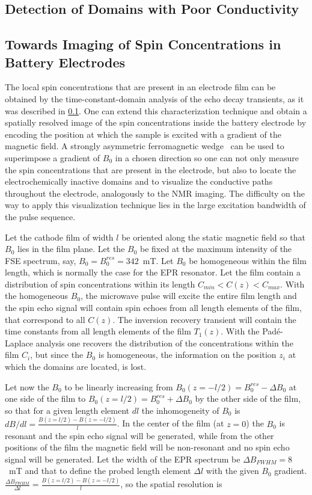 \subsection{Detection of Domains with Poor Conductivity}
\label{sec:domains_distinction_by_relaxation}

\subsection{Towards Imaging of Spin Concentrations in Battery Electrodes}
The local spin concentrations that are present in an electrode film can be obtained by the time-constant-domain analysis of the echo decay transients, as it was described in \ref{sec:domains_distinction_by_relaxation}. One can extend this characterization technique and obtain a spatially resolved image of the spin concentrations inside the battery electrode by encoding the position at which the sample is excited with a gradient of the magnetic field. A strongly asymmetric ferromagnetic wedge~\cite{SternGerlach1922} can be used to superimpose a gradient of $B_0$ in a chosen direction so one can not only measure the spin concentrations that are present in the electrode, but also to locate the electrochemically inactive domains and to visualize the conductive paths throughout the electrode, analogously to the NMR imaging. The difficulty on the way to apply this visualization technique lies in the large excitation bandwidth of the pulse sequence.
\par
Let the cathode film of width $l$ be oriented along the static magnetic field so that $B_0$ lies in the film plane. Let the $B_0$ be fixed at the maximum intensity of the FSE spectrum, say, $B_0 = B_0^{res}=342$~mT. Let $B_0$ be homogeneous within the film length, which is normally the case for the EPR resonator. Let the film contain a distribution of spin concentrations within its length $C_{min}<C(z)<C_{max}$. With the homogeneous $B_0$, the microwave pulse will excite the entire film length and the spin echo signal will contain spin echoes from all length elements of the film, that correspond to all $C(z)$. The inversion recovery transient will contain the time constants from all length elements of the film $T_1(z)$. With the Pad{\'e}-Laplace analysis one recovers the distribution of the concentrations within the film $C_i$, but since the $B_0$ is homogeneous, the information on the position $z_i$ at which the domains are located, is lost. 
\par
Let now the $B_0$ to be linearly increasing from $B_0(z=-l/2) = B_0^{res}-\Delta B_0$ at one side of the film to $B_0(z=l/2)=B_0^{res}+ \Delta B_0$ by the other side of the film, so that for a given length element $dl$ the inhomogeneity of $B_0$ is $dB/dl = \frac{B(z=l/2)-B(z=-l/2)}{l}$. In the center of the film (at $z=0$) the $B_0$ is resonant and the spin echo signal will be generated, while from the other positions of the film the magnetic field will be non-resonant and no spin echo signal will be generated. Let the width of the EPR spectrum be $\Delta B_{FWHM}=8$~mT and that to define the probed length element $\Delta l$ with the given $B_0$ gradient. $\frac{\Delta B_{FWHM}}{\Delta l} = \frac{B(z=l/2)-B(z=-l/2)}{l}$, so the spatial resolution is 

